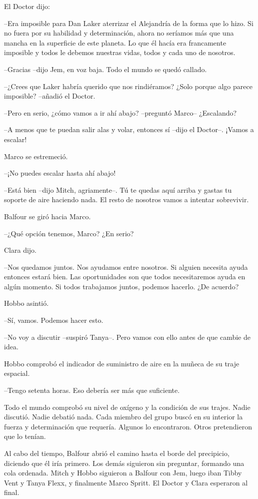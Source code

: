 {El Doctor dijo:}

{--Era imposible para Dan Laker aterrizar el Alejandría de la forma que
 lo hizo. Si no fuera por su habilidad y determinación, ahora no seríamos
 más que una mancha en la superficie de este planeta. Lo que él hacía era
 francamente imposible y todos le debemos nuestras vidas, todos y cada
uno de nosotros.}

{--Gracias --dijo Jem, en voz baja. Todo el mundo se quedó callado.}

{--¿Crees que Laker habría querido que nos rindiéramos? ¿Solo porque algo
parece imposible? --añadió el Doctor.}

{--Pero en serio, ¿cómo vamos a ir ahí abajo? --preguntó Marco--
¿Escalando?}

{--A menos que te puedan salir alas y volar, entonces sí --dijo el
Doctor--. ¡Vamos a escalar!}

{Marco se estremeció.}

{--¡No puedes escalar hasta ahí abajo!}

{--Está bien --dijo Mitch, agriamente--. Tú te quedas aquí arriba y
 gastas tu soporte de aire haciendo nada. El resto de nosotros vamos a
intentar sobrevivir.}

{Balfour se giró hacia Marco.}

{--¿Qué opción tenemos, Marco? ¿En serio?}

{Clara dijo.}

{--Nos quedamos juntos. Nos ayudamos entre nosotros. Si alguien necesita
 ayuda entonces estará bien. Las oportunidades son que todos
 necesitaremos ayuda en algún momento. Si todos trabajamos juntos,
podemos hacerlo. ¿De acuerdo?}

{Hobbo asintió.}

{--Sí, vamos. Podemos hacer esto.}

{--No voy a discutir --suspiró Tanya--. Pero vamos con ello antes de que
cambie de idea.}

{Hobbo comprobó el indicador de suministro de aire en la muñeca de su
traje espacial.}

{--Tengo setenta horas. Eso debería ser más que suficiente.}

{Todo el mundo comprobó su nivel de oxígeno y la condición de sus trajes.
 Nadie discutió. Nadie debatió nada. Cada miembro del grupo buscó en su
 interior la fuerza y determinación que requería. Algunos lo encontraron.
Otros pretendieron que lo tenían.}

{Al cabo del tiempo, Balfour abrió el camino hasta el borde del
 precipicio, diciendo que él iría primero. Los demás siguieron sin
 preguntar, formando una cola ordenada. Mitch y Hobbo siguieron a Balfour
 con Jem, luego iban Tibby Vent y Tanya Flexx, y finalmente Marco Spritt.
El Doctor y Clara esperaron al final.}

